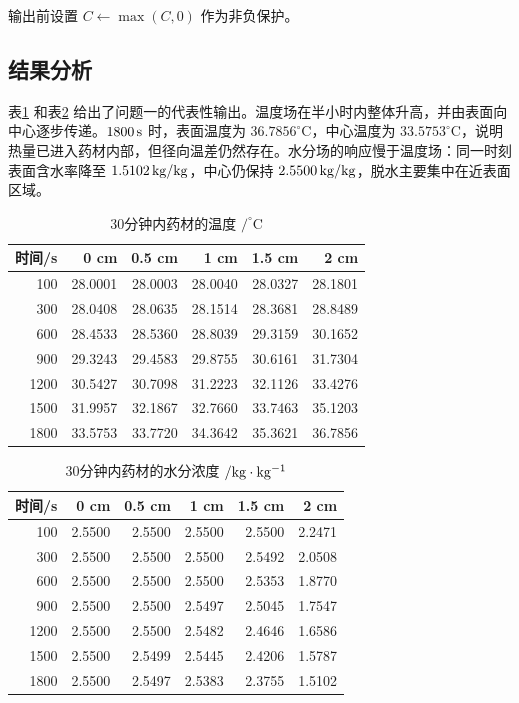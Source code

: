 \documentclass[UTF8,a4paper,12pt]{ctexart}
\begin{document}
输出前设置 $C\leftarrow\max(C,0)$ 作为非负保护。

\subsection{结果分析}
表\ref{tab:q1-temp} 和表\ref{tab:q1-moist} 给出了问题一的代表性输出。温度场在半小时内整体升高，并由表面向中心逐步传递。$1800\rm\,s$ 时，表面温度为 $36.7856^\circ\mathrm C$，中心温度为 $33.5753^\circ\mathrm C$，说明热量已进入药材内部，但径向温差仍然存在。水分场的响应慢于温度场：同一时刻表面含水率降至 $1.5102\rm\,kg/kg$，中心仍保持 $2.5500\rm\,kg/kg$，脱水主要集中在近表面区域。

\begin{table}[H]
  \centering
  \caption{30分钟内药材的温度 $/^\circ\mathrm C$}
  \label{tab:q1-temp}
  \begin{tabular}{rrrrrr}
    \toprule
    时间/s & 0 cm & 0.5 cm & 1 cm & 1.5 cm & 2 cm\\ \midrule
    100 & 28.0001 & 28.0003 & 28.0040 & 28.0327 & 28.1801\\
    300 & 28.0408 & 28.0635 & 28.1514 & 28.3681 & 28.8489\\
    600 & 28.4533 & 28.5360 & 28.8039 & 29.3159 & 30.1652\\
    900 & 29.3243 & 29.4583 & 29.8755 & 30.6161 & 31.7304\\
    1200 & 30.5427 & 30.7098 & 31.2223 & 32.1126 & 33.4276\\
    1500 & 31.9957 & 32.1867 & 32.7660 & 33.7463 & 35.1203\\
    1800 & 33.5753 & 33.7720 & 34.3642 & 35.3621 & 36.7856\\
    \bottomrule
  \end{tabular}
\end{table}

\begin{table}[H]
  \centering
  \caption{30分钟内药材的水分浓度 $/\rm kg\cdot kg^{-1}$}
  \label{tab:q1-moist}
  \begin{tabular}{rrrrrr}
    \toprule
    时间/s & 0 cm & 0.5 cm & 1 cm & 1.5 cm & 2 cm\\ \midrule
    100 & 2.5500 & 2.5500 & 2.5500 & 2.5500 & 2.2471\\
    300 & 2.5500 & 2.5500 & 2.5500 & 2.5492 & 2.0508\\
    600 & 2.5500 & 2.5500 & 2.5500 & 2.5353 & 1.8770\\
    900 & 2.5500 & 2.5500 & 2.5497 & 2.5045 & 1.7547\\
    1200 & 2.5500 & 2.5500 & 2.5482 & 2.4646 & 1.6586\\
    1500 & 2.5500 & 2.5499 & 2.5445 & 2.4206 & 1.5787\\
    1800 & 2.5500 & 2.5497 & 2.5383 & 2.3755 & 1.5102\\
    \bottomrule
  \end{tabular}
\end{table}
\end{document}
